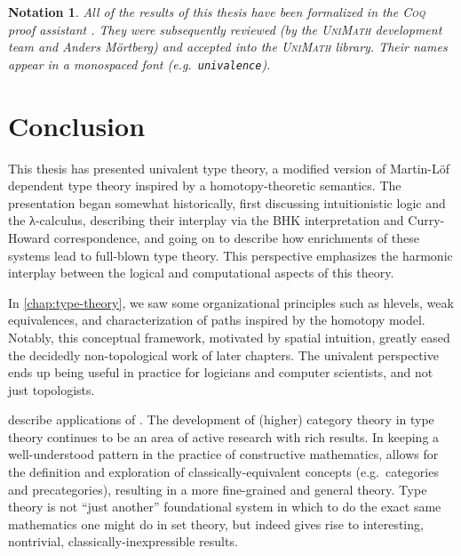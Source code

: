 \documentclass[12pt,twoside]{reedthesis}
\let\oldindex\index
\renewcommand{\index}[1]
               {\oldindex{#1}\marginpar{\footnotesize\color{index}index: #1}}
\newcommand{\indeX}{\oldindex}
\newcommand{\indeX}{\index}
\newcommand{\software}[1]{{\textsc{#1}}\indeX{#1}}
\newcommand{\UniMath}{\software{UniMath}}
\newcommand{\Coq}{\software{Coq}}
\newcommand{\unimathname}[1]{\texttt{#1}}
\newtheorem{notation}[theorem]{Notation}
\begin{document}
\begin{notation}
  All of the results of this thesis have been formalized in the \Coq{} proof
  assistant \cite{coq-manual}. They were subsequently reviewed (by the \UniMath{}
  development team \cite{unimath} and Anders Mörtberg) and accepted into the
  \UniMath{} library. Their names appear in a monospaced font (e.g.\
  \unimathname{univalence}). 
\end{notation}






\chapter*{Conclusion}
\setcounter{chapter}{5}
\setcounter{section}{0}

This thesis has presented univalent type theory, a modified version of Martin-Löf
dependent type theory inspired by a homotopy-theoretic semantics. The
presentation began somewhat historically, first discussing intuitionistic
logic and the λ-calculus, describing their interplay via the BHK interpretation
and Curry-Howard correspondence, and going on to describe how enrichments of
these systems lead to full-blown type theory. This perspective emphasizes
the harmonic interplay between the logical and computational aspects of this
theory. 

In \cref{chap:type-theory}, we saw some organizational principles such as
hlevels, weak equivalences, and characterization of paths inspired by the
homotopy model. Notably, this conceptual framework, motivated by spatial
intuition, greatly eased the decidedly non-topological work of later chapters. 
The univalent perspective ends up being useful in practice for logicians and
computer scientists, and not just topologists.

describe applications of \UTT{}. The development of (higher) category theory in
type theory continues to be an area of active research with rich results.
In keeping a well-understood pattern in the practice of constructive mathematics,
\UTT{} allows for the definition and exploration of classically-equivalent
concepts (e.g.\ categories and precategories), resulting in a more fine-grained
and general theory. Type theory is not ``just another'' foundational system in
which to do the exact same mathematics one might do in set theory, but indeed
gives rise to interesting, nontrivial, classically-inexpressible results.
\end{document}
